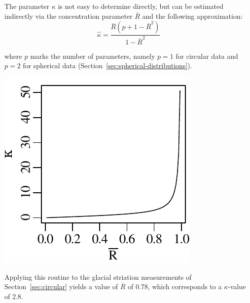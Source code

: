 The parameter $\kappa$ is not easy to determine directly, but can be
estimated indirectly via the concentration parameter $\bar{R}$ and the
following approximation:
\begin{equation}
  \hat{\kappa} = \frac{\bar{R}(p+1-\bar{R}^2)}{1-\bar{R}^2}
  \label{eq:kappa}
\end{equation}

\noindent where $p$ marks the number of parameters, namely $p=1$ for
circular data and $p=2$ for spherical data
(Section~\ref{sec:spherical-distributions}).

\noindent\begin{minipage}[t][][b]{.3\textwidth}
\includegraphics[]{../figures/R2K.pdf}\medskip
\end{minipage}
\begin{minipage}[t][][t]{.7\textwidth}
  \label{fig:R2K}
\end{minipage}

Applying this routine to the glacial striation measurements of
Section~\ref{sec:circular} yields a value of $\bar{R}$ of 0.78, which
corresponds to a $\kappa$-value of 2.8.

